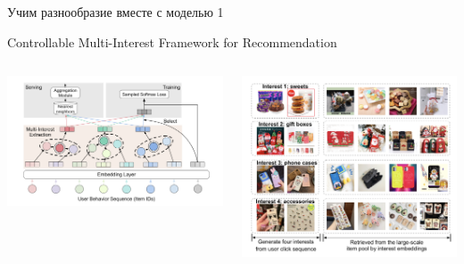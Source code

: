 \documentclass[11pt,aspectratio=169]{beamer}
\begin{document}
\begin{frame}{Учим разнообразие вместе с моделью 1}

\begin{center}
Controllable Multi-Interest Framework for Recommendation \cite{ALIBABA}
\end{center}

\begin{columns}
\begin{column}{0.45\textwidth}
\begin{center}
\includegraphics[scale=0.3]{images/alibaba.png}
\end{center}
\end{column}

\begin{column}{0.45\textwidth} 
\begin{center}
\includegraphics[scale=0.2]{images/divres.png}
\end{center}
\end{column}
\end{columns}

\end{frame}
\end{document}
